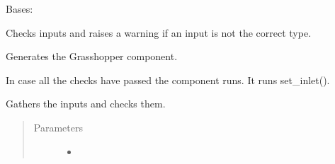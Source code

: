 \documentclass[letterpaper,10pt,english]{sphinxmanual}
\begin{document}
\begin{fulllineitems}
\label{\detokenize{cmf:livestock.components.comp_cmf.CMFInlet}}
Bases: {\hyperref[\detokenize{superclass:livestock.components.component.GHComponent}]{}}

\begin{fulllineitems}
\label{\detokenize{cmf:livestock.components.comp_cmf.CMFInlet.check_inputs}}
Checks inputs and raises a warning if an input is not the correct type.

\end{fulllineitems}


\begin{fulllineitems}
\label{\detokenize{cmf:livestock.components.comp_cmf.CMFInlet.config}}
Generates the Grasshopper component.

\end{fulllineitems}


\begin{fulllineitems}
\label{\detokenize{cmf:livestock.components.comp_cmf.CMFInlet.run}}
In case all the checks have passed the component runs.
It runs set\_inlet().

\end{fulllineitems}


\begin{fulllineitems}
\label{\detokenize{cmf:livestock.components.comp_cmf.CMFInlet.run_checks}}
Gathers the inputs and checks them.
\begin{quote}\begin{description}
\item[{Parameters}] \leavevmode\begin{itemize}
\item {} 
 \textendash{} 


\end{itemize}
\end{description}
\end{quote}
\end{fulllineitems}
\end{fulllineitems}
\end{document}
